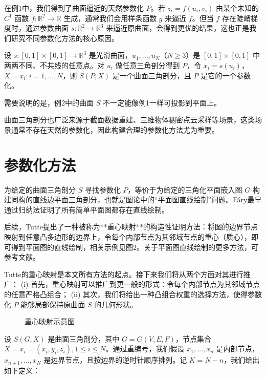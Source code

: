 \documentclass{ctexart}
\theoremstyle{proof}
\begin{document}
在例1中，我们得到了曲面逼近的天然参数化 $P$。若 $z_i=f(u_i,v_i)$ 由某个未知的 $C^1$ 函数 $f: \mathbb{R}^2 \to \mathbb{R}$ 生成，通常我们会用样条函数 $g$ 来逼近 $f$。但当 $f$ 存在陡峭梯度时，通过参数曲面 $s: \mathbb{R}^2 \to \mathbb{R}^3$ 来逼近原曲面，会得到更优的结果，这也正是我们研究不同参数化方法的核心原因。

\begin{example}
设 $s:[0,1] \times[0,1] \to \mathbb{R}^{3}$ 是光滑曲面，$u_{1}, ..., u_{N}$（$N ≥3$）是 $[0,1] \times[0,1]$ 中两两不同、不共线的任意点。对 $u_i$ 做任意三角剖分得到 $P$，令 $x_i=s(u_i)$，$X={x_i: i=1,...,N}$，则 $S(P,X)$ 是一个曲面三角剖分，且 $P$ 是它的一个参数化。
\end{example}

需要说明的是，例2中的曲面 $S$ 不一定能像例1一样可投影到平面上。

曲面三角剖分也广泛来源于截面数据重建\cite{schumaker1990,floater1995}、三维物体稠密点云采样\cite{hoppe1992}等场景，这类场景通常不存在天然的参数化，因此构建合理的参数化方法尤为重要。

\section{参数化方法}
为给定的曲面三角剖分 $S$ 寻找参数化 $P$，等价于为给定的三角化平面嵌入图 $G$ 构建同构的直线边平面三角剖分，也就是图论中的“平面图直线绘制”问题。Fáry\cite{fary1948}最早通过归纳法证明了所有简单平面图都存在直线绘制。

后续，Tutte\cite{tutte1960,tutte1963}提出了一种被称为**重心映射**的构造性证明方法：将图的边界节点映射到任意凸多边形的边界上，令每个内部节点为其邻域节点的重心（质心），即可得到平面图的直线绘制，相关示例见图2。关于平面图直线绘制的更多方法，可参考文献\cite{chiba1985,nishizeki1990}。

Tutte的重心映射是本文所有方法的起点。接下来我们将从两个方面对其进行推广：
(i) 首先，重心映射可以推广到更一般的形式：令每个内部节点为其邻域节点的任意严格凸组合；
(ii) 其次，我们将给出一种凸组合权重的选择方法，使得参数化 $P$ 能够局部保持原曲面 $S$ 的几何形状。

\begin{figure}[htbp]
    \centering
    \caption{重心映射示意图}
    \label{fig:2}
\end{figure}

设 $S(G, X)$ 是曲面三角剖分，其中 $G=G(V, E, F)$，节点集合 $X={x_{i}=(x_i,y_i,z_i), 1≤i≤N}$。通过重编号，我们假设 $x_1,...,x_n$ 是内部节点，$x_{n+1},...,x_N$ 是边界节点，且按边界的逆时针顺序排列。记 $K=N-n$，我们给出如下定义：
\end{document}
